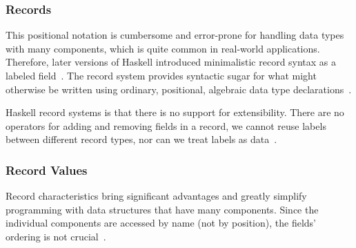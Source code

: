 \begin{frame}\frametitle{Records }
    
This positional notation is cumbersome and error-prone for handling data types with many components, which is quite common in real-world applications. Therefore, later versions of Haskell introduced minimalistic record syntax as a labeled field~\cite{lw-ext-records, history-of-haskell}.
The record system provides syntactic sugar for what might otherwise be written using ordinary, positional, algebraic data type declarations~\cite{lw-ext-records}. 

Haskell record systems is that there is no support for extensibility. There are no operators for adding and removing fields in a record, we cannot reuse labels between different record types, nor can we treat labels as data~\cite{poly-ext-records, hlist,lw-ext-records}. 


\end{frame}

\begin{frame}\frametitle{Record Values}

Record characteristics bring significant advantages and greatly simplify programming with data structures that have many components. Since the individual components are accessed by name (not by position), the fields' ordering is not crucial~\cite{lw-ext-records}.


\end{frame}

